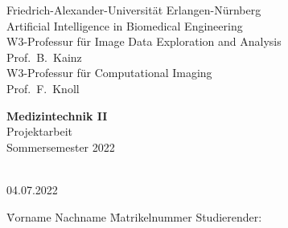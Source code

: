 

\begin{titlepage}

\begin{center}
Friedrich-Alexander-Universit\"at Erlangen-N\"urnberg\\
Artificial Intelligence in Biomedical Engineering\\
W3-Professur für Image Data Exploration and Analysis\\
Prof.\ B.\ Kainz\\
W3-Professur für Computational Imaging\\
Prof.\ F.\ Knoll\\


\vspace*{9em}

{\huge \textbf{\textsf{Medizintechnik II}}}\\[.3em]
{Projektarbeit}\\[.3em]
{Sommersemester 2022}\\

\vspace*{9em}

{\huge \textbf{\textsf{\titel}}}\\[.7em]
{04.07.2022} %
\end{center}

\vfill%
\begin{tabbing}
	\hspace*{5cm} \= Vorname Nachname \hspace*{4em} \= Matrikelnummer \kill
	Studierender:\> \erster \> \mnreins \\
\end{tabbing}

\end{titlepage}
